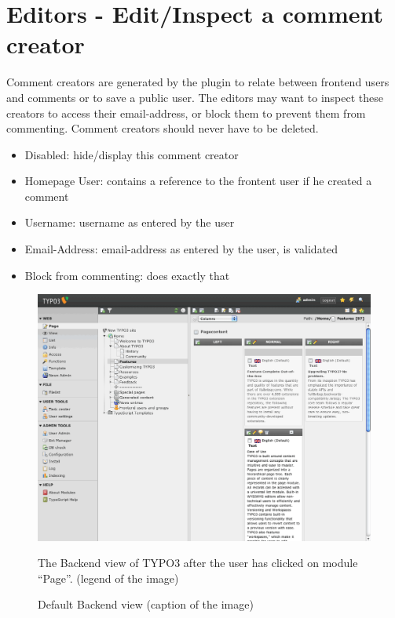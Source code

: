 \documentclass[a4paper,10pt,english]{sphinxmanual}
\begin{document}
\section{Editors - Edit/Inspect a comment creator}
\label{UsersManual/Index:editors-edit-inspect-a-comment-creator}
Comment creators are generated by the plugin to relate between frontend users and comments or to save a public user. The editors may want to inspect these creators to access their email-address, or block them to prevent them from commenting. Comment creators should never have to be deleted.
\begin{itemize}
\item {} 
Disabled: hide/display this comment creator

\item {} 
Homepage User: contains a reference to the frontent user if he created a comment

\item {} 
Username: username as entered by the user

\item {} 
Email-Address: email-address as entered by the user, is validated

\item {} 
Block from commenting: does exactly that

\end{itemize}
\begin{figure}[htbp]
\centering
\capstart

\includegraphics{BackendView.png}
\caption{Default Backend view (caption of the image)}{\small 
The Backend view of TYPO3 after the user has clicked on module ``Page''. (legend of the image)
}\end{figure}
\end{document}
